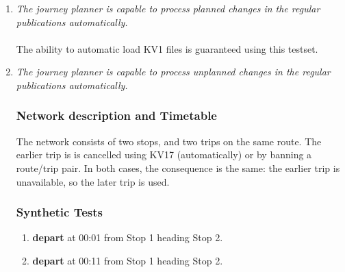 \documentclass[a4paper,11pt]{article}
\begin{document}
\begin{enumerate}

\item \textit{The journey planner is capable to process planned changes in the regular publications automatically.} \\
\\
The ability to automatic load KV1 files is guaranteed using this testset.\\


\item \textit{The journey planner is capable to process unplanned changes in the regular publications automatically.}

\subsubsection*{Network description and Timetable}
The network consists of two stops, and two trips on the same route.
The earlier trip is is cancelled using KV17 (automatically) or by banning a route/trip pair.
In both cases, the consequence is the same: the earlier trip is unavailable, so the later trip is used.

\begin{figure}[h]
\vspace{1em}
\raggedleft
\begin{minipage}{285pt}
\end{minipage}
\label{fig:delay_network}
\vspace{-2em}
\end{figure}

\subsubsection*{Synthetic Tests}
\begin{enumerate}
\item \textbf{depart} at 00:01 from Stop 1 heading Stop 2.
\item \textbf{depart} at 00:11 from Stop 1 heading Stop 2.
\end{enumerate}


\end{enumerate}
\end{document}
